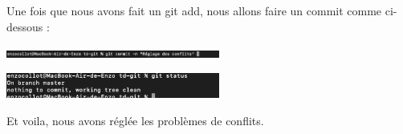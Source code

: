 \documentclass[12pt]{article}
\begin{document}
Une fois que nous avons fait un git add, nous allons faire un commit comme ci-dessous : 

\vspace{0.3cm}

\begin{center}
  \includegraphics[width=7cm]{Image-TD-Git-4/git-commit-conflits.png}
\end{center}

\vspace{0.3cm}

\begin{center}
  \includegraphics[width=7cm]{Image-TD-Git-4/git-status.png}
\end{center}

\vspace{0.3cm}

Et voila, nous avons réglée les problèmes de conflits.
\end{document}
